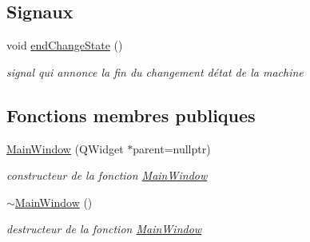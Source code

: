 \subsection*{Signaux}
\begin{DoxyCompactItemize}
\item 
void \hyperlink{classMainWindow_a2cd7fd54c497cd6a073ad43857266890}{end\+Change\+State} ()
\begin{DoxyCompactList}\small\item\em signal qui annonce la fin du changement d\textquotesingle{}état de la machine \end{DoxyCompactList}\end{DoxyCompactItemize}
\subsection*{Fonctions membres publiques}
\begin{DoxyCompactItemize}
\item 
\hyperlink{classMainWindow_a996c5a2b6f77944776856f08ec30858d}{Main\+Window} (Q\+Widget $\ast$parent=nullptr)
\begin{DoxyCompactList}\small\item\em constructeur de la fonction \hyperlink{classMainWindow}{Main\+Window} \end{DoxyCompactList}\item 
\hyperlink{classMainWindow_ae98d00a93bc118200eeef9f9bba1dba7}{$\sim$\+Main\+Window} ()
\begin{DoxyCompactList}\small\item\em destructeur de la fonction \hyperlink{classMainWindow}{Main\+Window} \end{DoxyCompactList}\end{DoxyCompactItemize}
